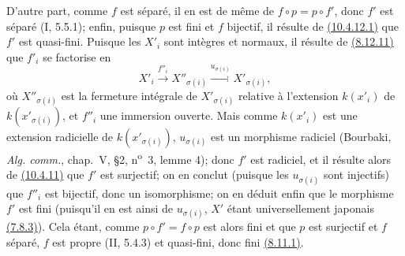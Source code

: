 D'autre part, comme $f$ est séparé, il en est de même de
$f\circ p=p\circ f'$, donc $f'$ est séparé (I, 5.5.1); enfin, puisque
$p$ est fini et $f$ bijectif, il résulte de
{\hyperlink{ega4.c04.sec.10-4-12-1}{(10.4.12.1)}} que $f'$ est
quasi-fini. Puisque les $X'_i$ sont intègres et normaux, il résulte de
{\hyperref[canon-index.ega4.c04.cor.8-12-11]{(8.12.11)}} que $f'_i$ se factorise en
\[
 X'_i\xrightarrow{f''_i}X''_{\sigma(i)}
 \xrightarrow{u_{\sigma(i)}}X'_{\sigma(i)},
\]
où $X''_{\sigma(i)}$ est la fermeture intégrale de
$X'_{\sigma(i)}$ relative à l'extension $k(x'_i)$ de
$k(x'_{\sigma(i)})$, et $f''_i$ une immersion ouverte. Mais comme
$k(x'_i)$ est une extension radicielle de $k(x'_{\sigma(i)})$,
$u_{\sigma(i)}$ est un morphisme radiciel (Bourbaki,
\emph{Alg. comm.}, chap.~V, \S2, n\textsuperscript{o}~3, lemme 4);
donc $f'$ est radiciel, et il résulte alors de
{\hyperref[canon-index.ega4.c04.statement.10-4-11]{(10.4.11)}} que $f'$ est
surjectif; on en conclut (puisque les $u_{\sigma(i)}$ sont injectifs)
que $f''_i$ est bijectif, donc un isomorphisme; on en déduit enfin que
le morphisme $f'$ est fini (puisqu'il en est ainsi de $u_{\sigma(i)}$,
$X'$ étant universellement japonais
{\hyperref[canon-index.ega4.c04.statement.7-8-3]{(7.8.3)}}). Cela étant, comme
$p\circ f'=f\circ p$ est alors fini et que $p$ est surjectif et $f$
séparé, $f$ est propre (II, 5.4.3) et quasi-fini, donc fini
{\hyperref[canon-index.ega4.c04.thm.8-11-1]{(8.11.1)}}.

